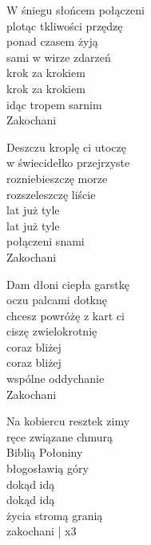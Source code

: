\begin{text}
    W śniegu słońcem połączeni\\
    plotąc tkliwości przędzę\\
    ponad czasem żyją\\
    sami w wirze zdarzeń\\
    krok za krokiem\\
    krok za krokiem\\
    idąc tropem sarnim\\
    Zakochani

    Deszczu kroplę ci utoczę\\
    w świecidełko przejrzyste\\
    rozniebieszczę morze\\
    rozszeleszczę liście\\
    lat już tyle\\
    lat już tyle\\
    połączeni snami\\
    Zakochani

    Dam dłoni ciepła garstkę\\
    oczu palcami dotknę\\
    chcesz powróżę z kart ci\\
    ciszę zwielokrotnię\\
    coraz bliżej\\
    coraz bliżej\\
    wspólne oddychanie\\
    Zakochani

    Na kobiercu resztek zimy\\
    ręce związane chmurą\\
    Biblią Połoniny\\
    błogosławią góry\\
    dokąd idą\\
    dokąd idą\\
    życia stromą granią\\
    zakochani | x3
\end{text}
\begin{chord}

\end{chord}